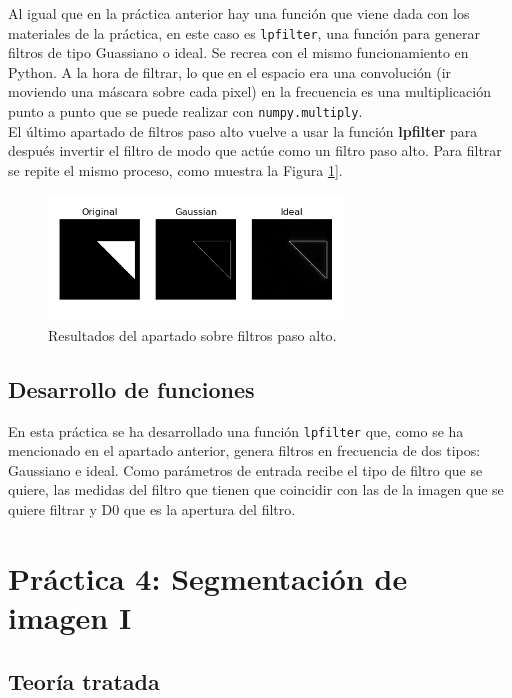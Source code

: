 \documentclass[a4paper,12pt]{report}
\begin{document}
Al igual que en la práctica anterior hay una función que viene dada con los materiales de la práctica, en este caso es  \texttt{lpfilter}, una función para generar filtros de tipo Guassiano o ideal. Se recrea con el mismo funcionamiento en Python. A la hora de filtrar, lo que en el espacio era una convolución (ir moviendo una máscara sobre cada pixel) en la frecuencia es una multiplicación punto a punto que se puede realizar con \texttt{numpy.multiply}.\\

El último apartado de filtros paso alto vuelve a usar la función \textbf{lpfilter} para después invertir el filtro de modo que actúe como un filtro paso alto. Para filtrar se repite el mismo proceso, como muestra la Figura \ref{fpa}].

\begin{figure}[h]
\centering
\includegraphics[width=0.7\textwidth]{imagenes/fpa}
\caption{Resultados del apartado sobre filtros paso alto.}
\label{fpa}
\end{figure}

\subsection{Desarrollo de funciones}

En esta práctica se ha desarrollado una función \texttt{lpfilter} que, como se ha mencionado en el apartado anterior, genera filtros en frecuencia de dos tipos: Gaussiano e ideal. Como parámetros de entrada recibe el tipo de filtro que se quiere, las medidas del filtro que tienen que coincidir con las de la imagen que se quiere filtrar y D0 que es la apertura del filtro.\\

\section{ Práctica 4: Segmentación de imagen I}
\subsection{Teoría tratada}
\end{document}

